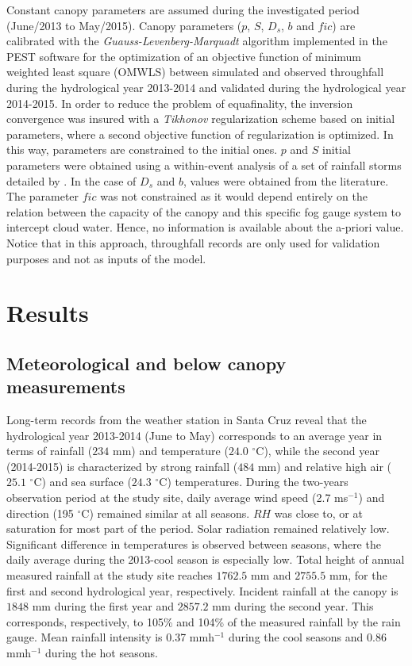 \documentclass[a4paper,12pt]{article}
\begin{document}
Constant canopy parameters are assumed during the investigated period (June/2013 to May/2015). Canopy parameters ($p$, $S$, $D_s$, $b$ and $fic$) are calibrated with the \emph{Guauss-Levenberg-Marquadt} algorithm implemented in the PEST software \citep{PestDoherty2010} for the optimization of an objective function of minimum weighted least square (OMWLS) between simulated and observed throughfall during the hydrological year 2013-2014 and validated during the hydrological year 2014-2015. In order to reduce the problem of equafinality, the inversion convergence was insured with a \textit{Tikhonov} regularization scheme based on initial parameters, where a second objective function of regularization is optimized. In this way, parameters are constrained to the initial ones. $p$ and $S$ initial parameters were obtained using a within-event analysis of a set of rainfall storms detailed by \cite{Linketal2004}. In the case of $D_s$ and $b$, values were obtained from the literature. The parameter $fic$ was not constrained as it would depend entirely on the relation between the capacity of the canopy and this specific fog gauge system to intercept cloud water. Hence, no information is available about the a-priori value. Notice that in this approach, throughfall records are only used for validation purposes and not as inputs of the model.

\section{Results}
\subsection{Meteorological and below canopy measurements}
Long-term records from the weather station in Santa Cruz reveal that the hydrological year 2013-2014 (June to May) corresponds to an average year in terms of rainfall ($234$ $\mathrm{{mm}}$) and temperature ($24.0$ $\mathrm{^{\circ}C}$), while the second year (2014-2015) is characterized by strong rainfall ($484$ $\mathrm{{mm}}$) and relative high air ($25.1$ $\mathrm{^{\circ}C}$) and sea surface ($24.3$ $\mathrm{^{\circ}C}$) temperatures. During the two-years observation period at the study site, daily average wind speed (2.7 ms$^{-1}$) and direction (195 $\mathrm{^{\circ}C}$) remained similar at all seasons. $RH$ was close to, or at saturation for most part of the period. Solar radiation remained relatively low. Significant difference in temperatures is observed between seasons, where the daily average during the 2013-cool season is especially low. Total height of annual measured rainfall at the study site reaches $1762.5$ $\mathrm{{mm}}$ and $2755.5$ $\mathrm{{mm}}$, for the first and second hydrological year, respectively. Incident rainfall at the canopy is $1848$ $\mathrm{{mm}}$ during the first year and $2857.2$ $\mathrm{{mm}}$ during the second year. This corresponds, respectively, to 105\% and 104\% of the measured rainfall by the rain gauge. Mean rainfall intensity is 0.37 mmh$^{-1}$ during the cool seasons and 0.86 mmh$^{-1}$ during the hot seasons.
\end{document}
